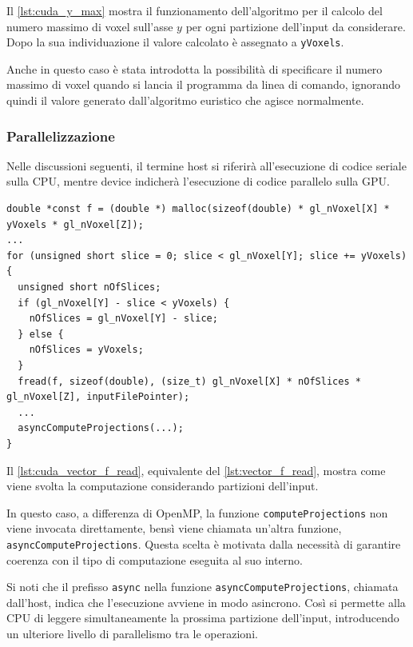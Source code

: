\documentclass[12pt,a4paper]{report}
\begin{document}
Il \autoref{lst:cuda_y_max} mostra il funzionamento dell'algoritmo per il calcolo del numero massimo di voxel sull'asse \(y\) per
ogni partizione dell'input da considerare.
Dopo la sua individuazione il valore calcolato è assegnato a \mbox{\lstinline{yVoxels}.}

Anche in questo caso è stata introdotta la possibilità di specificare il numero massimo di voxel quando si lancia il programma da
linea di comando, ignorando quindi il valore generato dall'algoritmo euristico che agisce normalmente.

\subsubsection{Parallelizzazione}

Nelle discussioni seguenti, il termine host si riferirà all'esecuzione di codice seriale sulla CPU, mentre device indicherà
l'esecuzione di codice parallelo sulla GPU.

\begin{lstlisting}[language=CStyle, caption={Codice CUDA-C per la lettura di \(f\).}, label={lst:cuda_vector_f_read}]
double *const f = (double *) malloc(sizeof(double) * gl_nVoxel[X] * yVoxels * gl_nVoxel[Z]);
...
for (unsigned short slice = 0; slice < gl_nVoxel[Y]; slice += yVoxels) {
  unsigned short nOfSlices;
  if (gl_nVoxel[Y] - slice < yVoxels) {
    nOfSlices = gl_nVoxel[Y] - slice;
  } else {
    nOfSlices = yVoxels;
  }
  fread(f, sizeof(double), (size_t) gl_nVoxel[X] * nOfSlices * gl_nVoxel[Z], inputFilePointer);
  ...
  asyncComputeProjections(...);
}
\end{lstlisting}

Il \autoref{lst:cuda_vector_f_read}, equivalente del \autoref{lst:vector_f_read}, mostra come viene svolta la computazione
considerando partizioni dell'input.

In questo caso, a differenza di OpenMP, la funzione \lstinline{computeProjections} non viene invocata direttamente, bensì viene
chiamata un'altra funzione, \mbox{\lstinline{asyncComputeProjections}.}
Questa scelta è motivata dalla necessità di garantire coerenza con il tipo di computazione eseguita al suo interno.

Si noti che il prefisso \lstinline{async} nella funzione \mbox{\lstinline{asyncComputeProjections},} chiamata dall'host, indica
che l'esecuzione avviene in modo asincrono.
Così si permette alla CPU di leggere simultaneamente la prossima partizione dell'input, introducendo un ulteriore livello di
parallelismo tra le operazioni.
\end{document}
